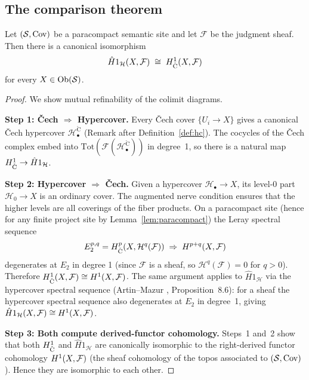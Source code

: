 \documentclass[11pt]{article}
\newcommand{\HC}{\mathcal{H}}              %
\newcommand{\HCech}{\hat{H}}              %
\begin{document}
\subsection{The comparison theorem}

\begin{theorem}\label{thm:comparison}
  Let $(\mathcal{S}, \mathrm{Cov})$ be a paracompact \JuGeo{} semantic site and
  let $\mathcal{F}$ be the judgment sheaf.  Then there is a canonical
  isomorphism
  \[
    \HCech{1}_{\HC}(X, \mathcal{F})
    \;\cong\;
    \Hcoh{1}_{\mathrm{\check{C}}}(X, \mathcal{F})
  \]
  for every $X \in \mathrm{Ob}(\mathcal{S})$.
\end{theorem}

\begin{proof}
  We show mutual refinability of the colimit diagrams.

  \medskip
  \noindent\textbf{Step 1: Čech $\Rightarrow$ Hypercover.}
  Every Čech cover $\{U_i \to X\}$ gives a canonical Čech hypercover
  $\HC^{\mathrm{\check{C}}}_\bullet$ (Remark after Definition~\ref{def:hc}).
  The cocycles of the Čech complex embed into
  $\mathrm{Tot}(\mathcal{F}(\HC^{\mathrm{\check{C}}}_\bullet))$ in degree~1,
  so there is a natural map
  $\Hcoh{1}_{\mathrm{\check{C}}} \to \HCech{1}_{\HC}$.

  \medskip
  \noindent\textbf{Step 2: Hypercover $\Rightarrow$ Čech.}
  Given a hypercover $\HC_\bullet \to X$, its level-0 part
  $\HC_0 \to X$ is an ordinary cover.  The augmented nerve condition
  ensures that the higher levels are all coverings of the fiber
  products.  On a paracompact site (hence for any finite project site
  by Lemma~\ref{lem:paracompact}) the Leray spectral sequence
  \[
    E_2^{p,q} = H^{p}_{\mathrm{\check{C}}}(X, \mathcal{H}^q(\mathcal{F}))
    \;\Rightarrow\;
    H^{p+q}(X, \mathcal{F})
  \]
  degenerates at $E_2$ in degree 1 (since $\mathcal{F}$ is a sheaf,
  so $\mathcal{H}^q(\mathcal{F}) = 0$ for $q > 0$).  Therefore
  $H^{1}_{\mathrm{\check{C}}}(X, \mathcal{F}) \cong H^{1}(X, \mathcal{F})$.
  The same argument applies to $\HCech{1}_{\HC}$ via the hypercover
  spectral sequence (Artin--Mazur \cite{artinmazur1969}, Proposition~8.6):
  for a sheaf the hypercover spectral sequence also degenerates at $E_2$
  in degree~1, giving $\HCech{1}_{\HC}(X, \mathcal{F})
  \cong \Hcoh{1}(X, \mathcal{F})$.

  \medskip
  \noindent\textbf{Step 3: Both compute derived-functor cohomology.}
  Steps~1 and~2 show that both $H^{1}_{\mathrm{\check{C}}}$ and
  $\HCech{1}_{\HC}$ are canonically isomorphic to the right-derived
  functor cohomology $H^{1}(X, \mathcal{F})$ (the sheaf cohomology
  of the topos associated to $(\mathcal{S}, \mathrm{Cov})$).  Hence they are
  isomorphic to each other.
\end{proof}
\end{document}
